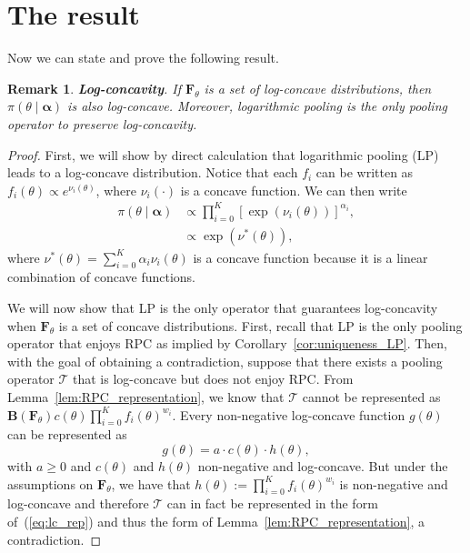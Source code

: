 \documentclass[a4paper, notitlepage, 10pt]{article}
\newtheorem{remark}{Remark}[]
\begin{document}
\section*{The result}

Now we can state and prove the following result.
\begin{remark}
\label{rmk:concavity}
\textbf{Log-concavity}. 
If $\mathbf{F}_{\theta}$ is a set of log-concave distributions, then $\pi(\theta\mid \boldsymbol \alpha)$ is also log-concave.
Moreover, logarithmic pooling is the only pooling operator to preserve log-concavity.
\end{remark}
\begin{proof}
First, we will show by direct calculation that logarithmic pooling (LP) leads to a log-concave distribution.
Notice that each $f_i$ can be written as $ f_i(\theta) \propto e^{\nu_i(\theta)}$, where $\nu_i(\cdot)$ is a concave function.
We can then write
\begin{align*}
 \pi(\theta \mid \boldsymbol \alpha) &\propto \prod_{i=0}^{K} [\exp(\nu_i(\theta))]^{\alpha_i},\\
             &\propto \exp(\nu^{\ast}(\theta)),
\end{align*}
 where $\nu^{\ast}(\theta) = \sum_{i=0}^{K}\alpha_i\nu_i(\theta)$ is a concave function because it is a linear combination of concave functions.
 
 We will now show that LP is the only operator that guarantees log-concavity when $\boldsymbol F_\theta$ is a set of concave distributions.
 First, recall that LP is the only pooling operator that enjoys RPC as implied by Corollary~\ref{cor:uniqueness_LP}.
 Then, with the goal of obtaining a contradiction, suppose that there exists a pooling operator $\mathcal{T}$ that is log-concave but does not enjoy RPC.
 From Lemma~\ref{lem:RPC_representation}, we know that $\mathcal{T}$ cannot be represented as $\boldsymbol B(\boldsymbol F_\theta) c(\theta) \prod_{i=0}^K f_i(\theta)^{w_i} $.
Every non-negative log-concave function $g(\theta)$ can be represented as
 \begin{equation}
 \label{eq:lc_rep}
  g(\theta) = a \cdot c(\theta) \cdot h(\theta),
 \end{equation}
with $a \geq 0$ and $c(\theta)$ and $h(\theta)$ non-negative and log-concave.
But under the assumptions on $\boldsymbol F_\theta$, we have that $h(\theta) := \prod_{i=0}^K f_i(\theta)^{w_i}$ is non-negative and log-concave and therefore $\mathcal{T}$ can in fact be represented in the form of~(\ref{eq:lc_rep}) and thus the form of Lemma~\ref{lem:RPC_representation}, a contradiction. 
\end{proof}
\end{document}
